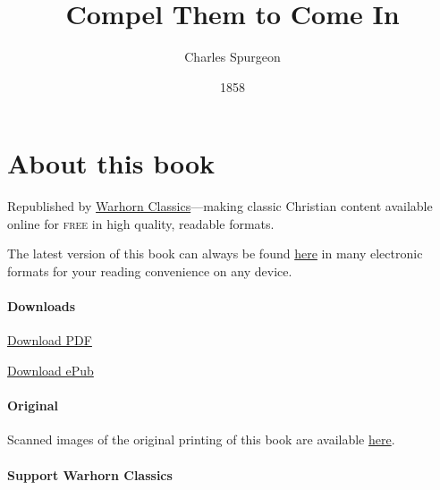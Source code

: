 \documentclass[
]{book}
\title{Compel Them to Come In}
\author{Charles Spurgeon}
\date{1858}
\begin{document}
\maketitle

\mainmatter
{}

{
\setcounter{tocdepth}{1}
\tableofcontents
}
\hypertarget{about-this-book}{%
\chapter*{About this book}\label{about-this-book}}

Republished by \href{https://classics.warhornmedia.com/}{Warhorn Classics}---making classic Christian content available online for \textsc{free} in high quality, readable formats.

The latest version of this book can always be found \href{https://warhornmedia.github.io/spurgeon-compel-them-to-come-in/}{here} in many electronic formats for your reading convenience on any device.

\hypertarget{downloads}{%
\subsubsection*{Downloads}\label{downloads}}

\href{https://warhornmedia.github.io/spurgeon-compel-them-to-come-in//Spurgeon-Compel_Them_to_Come_In.pdf}{Download PDF}

\href{https://warhornmedia.github.io/spurgeon-compel-them-to-come-in//Spurgeon-Compel_Them_to_Come_In.epub}{Download ePub}

\hypertarget{original}{%
\subsubsection*{Original}\label{original}}

Scanned images of the original printing of this book are available \href{https://www.spurgeongems.org/sermon/chs227.pdf}{here}.

\hypertarget{support-warhorn-classics}{%
\subsubsection*{Support Warhorn Classics}\label{support-warhorn-classics}}
\end{document}
